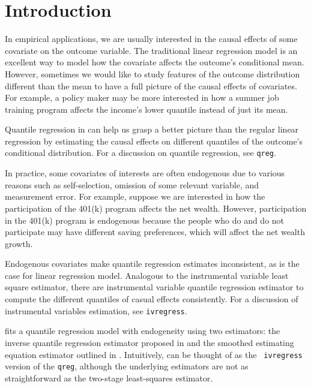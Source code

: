 \section{Introduction}

In empirical applications, we are usually interested in the causal effects of
some covariate on the outcome variable. The traditional linear regression model
is an excellent way to model how the covariate affects the outcome's conditional
mean. 
However, sometimes we would like to study features of the outcome distribution
different than the mean to have a full picture of the causal effects of
covariates.
For example, a policy maker may be more interested in how a summer
job training program affects the income's lower quantile instead of just
its mean. 

Quantile regression in \cite{Koenker1978} can help us grasp a better picture
than the regular linear regression by estimating the causal effects on different
quantiles of the outcome's conditional distribution. 
For a discussion on quantile regression, see {\tt qreg}.

In practice, some covariates of interests are often endogenous due to various
reasons such as self-selection, omission of some relevant variable, and
measurement error. For example, suppose we are interested in how the
participation of the 401(k) program affects the net wealth. However,
participation in the 401(k) program is endogenous because the people who do and
do not participate may have different saving preferences, which will affect the
net wealth growth. 

Endogenous covariates make quantile regression estimates inconsistent, as
is the case for linear regression model. Analogous to the instrumental
variable least square estimator, there are instrumental variable quantile
regression estimator to compute the different quantiles of casual effects
consistently. For a discussion of instrumental variables estimation, see
{\tt ivregress}.

{\ivqreg} fits a quantile regression model with endogeneity using
two estimators: the inverse quantile regression estimator proposed in
\cite{Chernozhukov2006} and the smoothed estimating equation estimator outlined
in \cite{Kaplan2017}.  Intuitively, {\ivqreg} can be thought of as the {\tt
ivregress} version of the {\tt qreg}, although the underlying estimators are not
as straightforward as the two-stage least-squares estimator. 

